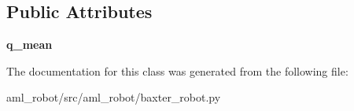 \subsection*{Public Attributes}
\begin{DoxyCompactItemize}
\item 
\hypertarget{classaml__robot_1_1baxter__robot_1_1_baxter_arm_adf4365cfefdb2632a538a3f225023aa7}{{\bfseries q\-\_\-mean}}\label{classaml__robot_1_1baxter__robot_1_1_baxter_arm_adf4365cfefdb2632a538a3f225023aa7}

\end{DoxyCompactItemize}


The documentation for this class was generated from the following file\-:\begin{DoxyCompactItemize}
\item 
aml\-\_\-robot/src/aml\-\_\-robot/baxter\-\_\-robot.\-py\end{DoxyCompactItemize}
